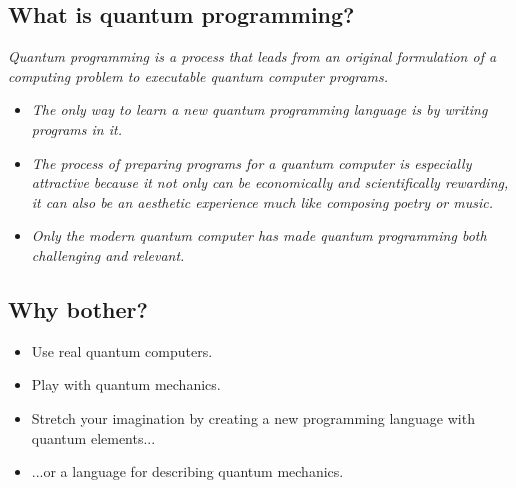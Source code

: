 \documentclass{beamer}
\begin{document}
\subsection{What is quantum programming?}
\begin{frame}{\insertsection}{\insertsubsection}
    
\emph{Quantum programming is a process that leads from an 
original formulation of a computing problem to executable quantum computer 
programs.}
\end{frame}


\begin{frame}{\insertsection}{\insertsubsection}

\begin{itemize}
    
    \item<1-> \emph{The only way to learn a new quantum programming language is 
    by writing programs in it.}

    \item<2-> \emph{The process of preparing programs for a quantum computer is 
    especially attractive because it not only can be economically and 
    scientifically rewarding, it can also be an aesthetic experience much like 
    composing poetry or music.}

    \item<3-> \emph{Only the modern quantum computer has made quantum 
    programming both challenging and relevant.}

\end{itemize}
\end{frame}

\subsection{Why bother?}

\begin{frame}{\insertsection}{\insertsubsection}
    
	\begin{itemize}
        \item<1-> Use real quantum computers. 
        \item<2-> Play with quantum mechanics.
        \item<3-> Stretch your imagination by creating a new programming 
        language with quantum elements...
        \item<4->{...or a language for describing quantum mechanics.}
    \end{itemize}
	
\end{frame}
\end{document}
